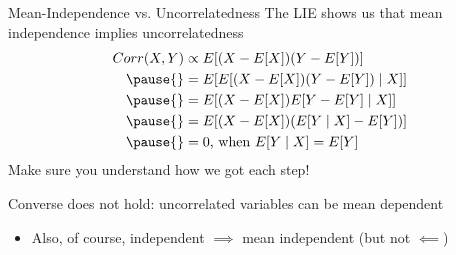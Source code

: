 \documentclass[11pt,english,handout]{beamer}
\begin{document}
\begin{frame}{Mean-Independence vs. Uncorrelatedness}
\vspace{0.2cm}
The LIE shows us that mean independence implies uncorrelatedness
\begin{align*}
Corr(X,Y)&\propto E[(X-E[X])(Y-E[Y])]\\ \pause{}
&=E[E[(X-E[X])(Y-E[Y])\mid X]]\\ \pause{}
&= E[(X-E[X])E[Y-E[Y]\mid X]]\\\pause{}
&= E[(X-E[X])(E[Y\mid X]-E[Y])]\\\pause{}
&= 0\text{, when $E[Y\mid X]=E[Y]$}
\end{align*}
\pause{}
\vspace{0.3cm}
Make sure you understand how we got each step! 
\vspace{0.5cm}
\pause{}

Converse does not hold: uncorrelated variables can be mean dependent
\pause{}

\begin{itemize}
\item Also, of course, independent $\implies$ mean independent (but not $\impliedby$)
\end{itemize}

\end{frame}
\end{document}
